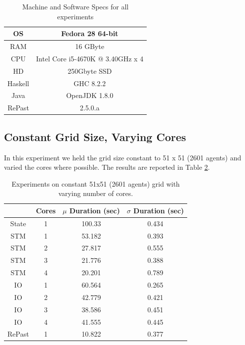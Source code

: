 \begin{table}
	\centering
	\begin{tabular}{ c || c }
		OS & Fedora 28 64-bit \\ \hline
		RAM & 16 GByte \\ \hline
		CPU & Intel Core i5-4670K @ 3.40GHz x 4 \\ \hline
		HD & 250Gbyte SSD \\ \hline
		Haskell & GHC 8.2.2 \\ \hline
		Java & OpenJDK 1.8.0 \\ \hline
		RePast & 2.5.0.a
	\end{tabular}
	
	\caption{Machine and Software Specs for all experiments}
	\label{tab:machine_specs}
\end{table}

\subsection{Constant Grid Size, Varying Cores}
In this experiment we held the grid size constant to 51 x 51 (2601 agents) and varied the cores where possible. The results are reported in Table \ref{tab:constgrid_varyingcores}.

\begin{table}
	\centering
  	\begin{tabular}{ c || c | c | c }
               & Cores & $\mu$ Duration (sec) & $\sigma$ Duration (sec) \\ \hline \hline 
    	State  & 1     & 100.33               & 0.434 \\ \hline \hline
   		STM    & 1     & 53.182               & 0.393 \\ \hline
   		STM    & 2     & 27.817               & 0.555 \\ \hline
   		STM    & 3     & 21.776               & 0.388 \\ \hline
   		STM    & 4     & 20.201               & 0.789 \\ \hline \hline
   		IO     & 1     & 60.564               & 0.265 \\ \hline 
   		IO     & 2     & 42.779               & 0.421 \\ \hline 
   		IO     & 3     & 38.586               & 0.451 \\ \hline 
   		IO     & 4     & 41.555               & 0.445 \\ \hline \hline
   		RePast & 1     & 10.822               & 0.377 \\ \hline 
  	\end{tabular}
  	
  	\caption{Experiments on constant 51x51 (2601 agents) grid with varying number of cores.}
	\label{tab:constgrid_varyingcores}
\end{table}

